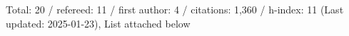Total: 20 / refereed: 11 / first author: 4 / citations: 1,360 / h-index: 11 (Last updated: 2025-01-23), List attached below